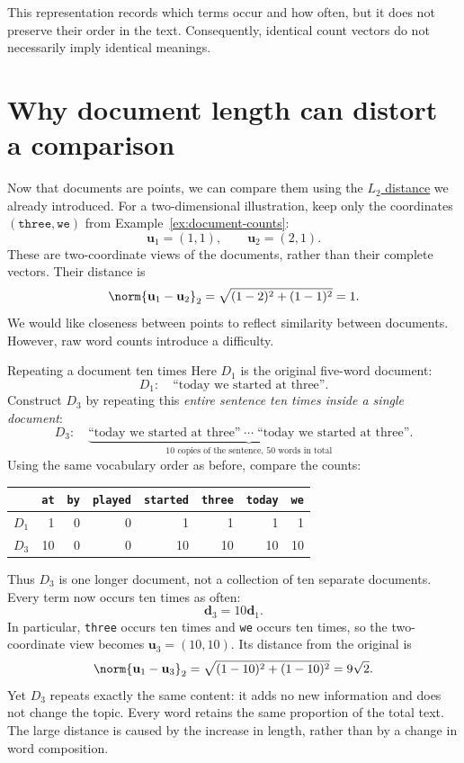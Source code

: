 \documentclass[a4paper,12pt,oneside]{report}
\begin{document}
This representation records which terms occur and how often, but it
does not preserve their order in the text. Consequently, identical
count vectors do not necessarily imply identical meanings.

\section{Why document length can distort a comparison}

Now that documents are points, we can compare them using the
\hyperref[def:euclidean]{$L_2$ distance} we already introduced.
For a two-dimensional illustration, keep only the coordinates
$(\texttt{three},\texttt{we})$ from Example~\ref{ex:document-counts}:
\[
  \mathbf u_1=(1,1),\qquad \mathbf u_2=(2,1).
\]
These are two-coordinate views of the documents, rather than their
complete vectors. Their distance is
\[
  \norm{\mathbf u_1-\mathbf u_2}_2
  =\sqrt{(1-2)^2+(1-1)^2}=1.
\]
We would like closeness between points to reflect similarity between
documents. However, raw word counts introduce a difficulty.

\begin{framedexample}{Repeating a document ten times}\label{ex:document-length}
Here $D_1$ is the original five-word document:
\[
  D_1:\quad\text{``today we started at three''}.
\]
Construct $D_3$ by repeating this \emph{entire sentence ten times
inside a single document}:
\[
  D_3:\quad\underbrace{\text{``today we started at three''}\;\cdots\;
    \text{``today we started at three''}}_{\text{10 copies of the sentence, 50 words in total}}.
\]
Using the same vocabulary order as before, compare the counts:
\begin{center}
\begin{tabular}{c|rrrrrrr}
  & \texttt{at} & \texttt{by} & \texttt{played} & \texttt{started}
  & \texttt{three} & \texttt{today} & \texttt{we}\\\hline
  $D_1$ & 1 & 0 & 0 & 1 & 1 & 1 & 1\\
  $D_3$ & 10 & 0 & 0 & 10 & 10 & 10 & 10
\end{tabular}
\end{center}
Thus $D_3$ is one longer document, not a collection of ten separate
documents. Every term now occurs ten times as often:
\[
  \mathbf d_3=10\mathbf d_1.
\]
In particular, \texttt{three} occurs ten times and \texttt{we} occurs
ten times, so the two-coordinate view becomes $\mathbf u_3=(10,10)$.
Its distance from the original is
\[
  \norm{\mathbf u_1-\mathbf u_3}_2
  =\sqrt{(1-10)^2+(1-10)^2}=9\sqrt2.
\]
Yet $D_3$ repeats exactly the same content: it adds no new information
and does not change the topic. Every word retains the same proportion
of the total text. The large distance is caused by the increase in
length, rather than by a change in word composition.
\end{framedexample}
\end{document}
